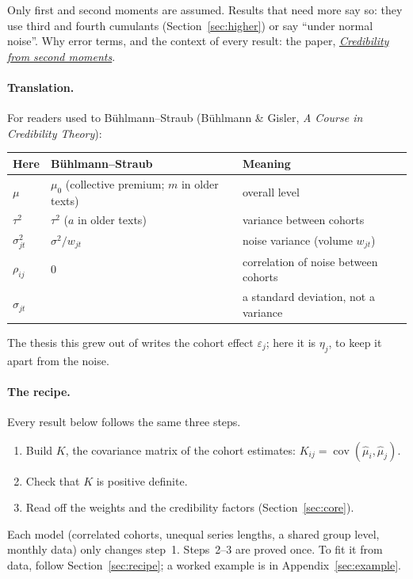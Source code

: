 \documentclass[11pt]{article}
\theoremstyle{remark}
\newcommand{\hmu}{\hat\mu}
\newcommand{\cov}{\operatorname{cov}}
\begin{document}
Only first and second moments are assumed. Results that need more say so: they use third and
fourth cumulants (Section~\ref{sec:higher}) or say ``under normal noise''. Why error terms, and
the context of every result: the paper, \href{https://mikaelandblom-coder.github.io/credible-lean/paper.pdf}{\emph{Credibility from second moments}}.

\paragraph{Translation.} For readers used to Bühlmann--Straub
(Bühlmann \& Gisler, \emph{A Course in Credibility Theory}):

\begin{center}
\begin{tabular}{lll}
  \toprule
  Here & Bühlmann--Straub & Meaning \\
  \midrule
  $\mu$ & $\mu_0$ (collective premium; $m$ in older texts) & overall level \\
  $\tau^2$ & $\tau^2$ ($a$ in older texts) & variance between cohorts \\
  $\sigma_{jt}^2$ & $\sigma^2/w_{jt}$ & noise variance (volume $w_{jt}$) \\
  $\rho_{ij}$ & $0$ & correlation of noise between cohorts \\
  $\sigma_{jt}$ & & a standard deviation, not a variance \\
  \bottomrule
\end{tabular}
\end{center}
The thesis this grew out of writes the cohort effect $\varepsilon_j$; here it
is $\eta_j$, to keep it apart from the noise.

\paragraph{The recipe.} Every result below follows the same three steps.
\begin{enumerate}
  \item Build $K$, the covariance matrix of the cohort estimates:
        $K_{ij} = \cov(\hmu_i, \hmu_j)$.
  \item Check that $K$ is positive definite.
  \item Read off the weights and the credibility factors (Section~\ref{sec:core}).
\end{enumerate}
Each model (correlated cohorts, unequal series lengths, a shared group level, monthly data)
only changes step~1. Steps~2--3 are proved once. To fit it from data, follow
Section~\ref{sec:recipe}; a worked example is in Appendix~\ref{sec:example}.
\end{document}
